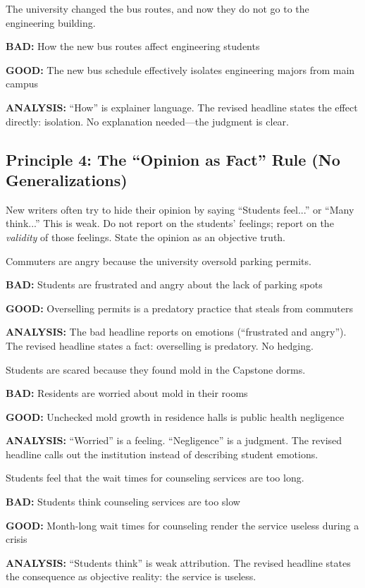 \documentclass[12pt]{article}
\newcommand{\bad}[1]{\textbf{\textcolor{rose}{BAD:}} #1}
\newcommand{\good}[1]{\textbf{\textcolor{congaree}{GOOD:}} #1}
\newcommand{\context}[1]{#1}
\begin{document}
\begin{exampleblock}
\context{The university changed the bus routes, and now they do not go to the engineering building.}

\bad{How the new bus routes affect engineering students}

\good{The new bus schedule effectively isolates engineering majors from main campus}

\textbf{ANALYSIS:} ``How'' is explainer language. The revised headline states the effect directly: isolation. No explanation needed---the judgment is clear.
\end{exampleblock}

\newpage
\subsection{Principle 4: The ``Opinion as Fact'' Rule (No Generalizations)}
New writers often try to hide their opinion by saying ``Students feel...'' or ``Many think...'' This is weak. Do not report on the students' feelings; report on the \textit{validity} of those feelings. State the opinion as an objective truth.

\begin{exampleblock}
\context{Commuters are angry because the university oversold parking permits.}

\bad{Students are frustrated and angry about the lack of parking spots}

\good{Overselling permits is a predatory practice that steals from commuters}

\textbf{ANALYSIS:} The bad headline reports on emotions (``frustrated and angry''). The revised headline states a fact: overselling is predatory. No hedging.
\end{exampleblock}

\begin{exampleblock}
\context{Students are scared because they found mold in the Capstone dorms.}

\bad{Residents are worried about mold in their rooms}

\good{Unchecked mold growth in residence halls is public health negligence}

\textbf{ANALYSIS:} ``Worried'' is a feeling. ``Negligence'' is a judgment. The revised headline calls out the institution instead of describing student emotions.
\end{exampleblock}

\begin{exampleblock}
\context{Students feel that the wait times for counseling services are too long.}

\bad{Students think counseling services are too slow}

\good{Month-long wait times for counseling render the service useless during a crisis}

\textbf{ANALYSIS:} ``Students think'' is weak attribution. The revised headline states the consequence as objective reality: the service is useless.
\end{exampleblock}
\end{document}
